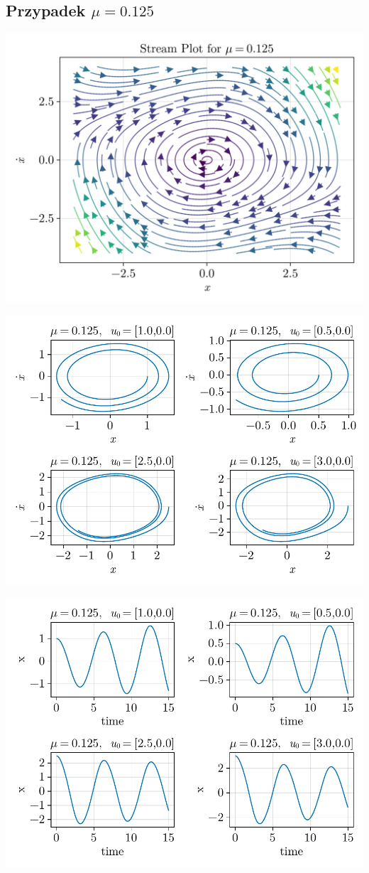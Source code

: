 \clearpage

%
%
\subsection{Przypadek $\mu = 0.125$}
\includegraphics[width=\textwidth]{out/stream_04.png}

\includegraphics[width=\textwidth]{out/phase_04.pdf}

\includegraphics[width=\textwidth]{out/xfromt_04.pdf}

